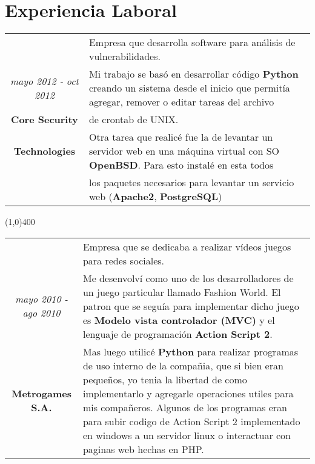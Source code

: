 \section{Experiencia Laboral}

\begin{tabular}{c|p{12.5cm}}
& \large Empresa que desarrolla software para análisis de vulnerabilidades.\\
\large\textit{mayo 2012 - oct 2012} &  \large Mi trabajo se basó en desarrollar código \textbf{Python} creando un sistema desde el inicio que permitía agregar, remover o editar tareas del archivo \\
\large\textbf{Core Security} & \large  de crontab de UNIX.\\
\large\textbf{Technologies} & \large  Otra tarea que realicé fue la de levantar un servidor web en una máquina virtual con SO \textbf{OpenBSD}. Para esto instalé en esta todos\\
& \large los paquetes necesarios para levantar un servicio web (\textbf{Apache2}, \textbf{PostgreSQL}) \\
\end{tabular}

\begin{center}
\line(1,0){400}
\end{center}
\noindent
\begin{tabular}{c|p{12.5cm}}
& \large Empresa que se dedicaba a realizar vídeos juegos para redes sociales.\\
\large\textit{mayo 2010 - ago 2010} &  \large Me desenvolví como uno de los desarrolladores de un juego particular llamado Fashion World. El patron que se seguía para implementar dicho juego es \textbf{Modelo vista controlador (MVC)} y el lenguaje de programación \textbf{Action Script 2}.\\
\large\textbf{Metrogames S.A.} & \large Mas luego utilicé \textbf{Python} para realizar programas de uso interno de la compañia, que si bien eran pequeños, yo tenia la libertad de como implementarlo y agregarle operaciones utiles para mis compañeros. Algunos de los programas eran para subir codigo de Action Script 2 implementado en windows a un servidor linux o interactuar con paginas web hechas en PHP.
\end{tabular}

